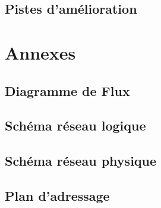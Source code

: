 \documentclass[a4paper,12pt]{report}
\begin{document}
        \section{Pistes d'amélioration}

    \chapter*{Annexes}
        \section{Diagramme de Flux}
        \section{Schéma réseau logique}
        \section{Schéma réseau physique}
        \section{Plan d'adressage}
        
\end{document}
